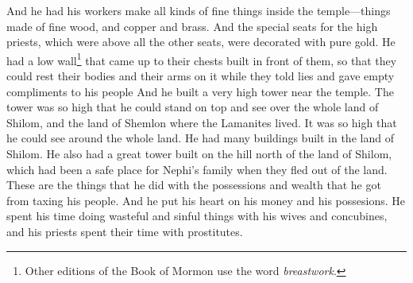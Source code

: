And he had his workers make all kinds of fine things inside the temple---things made of fine wood, and copper and brass.
\bverse \iffalse And the seats which were set apart for the high priests, which were above all the other seats, he did ornament with pure gold; and he caused a breastwork to be built before them, that they might rest their bodies and their arms upon while they should speak lying and vain words to his people. \fi
And the special seats for the high priests, which were above all the other seats, were decorated with pure gold. He had a low wall\footnote{Other editions of the Book of Mormon use the word \textit{breastwork}.} that came up to their chests built in front of them, so that they could rest their bodies and their arms on it while they told lies and gave empty compliments to his people
\bverse \iffalse And it came to pass that he built a tower near the temple; yea, a very high tower, even so high that he could stand upon the top thereof and overlook the land of Shilom, and also the land of Shemlon, which was possessed by the Lamanites; and he could even look over all the land round about. \fi
And he built a very high tower near the temple. The tower was so high that he could stand on top and see over the whole land of Shilom, and the land of Shemlon where the Lamanites lived. It was so high that he could see around the whole land.
\bverse \iffalse And it came to pass that he caused many buildings to be built in the land Shilom; and he caused a great tower to be built on the hill north of the land Shilom, which had been a resort for the children of Nephi at the time they fled out of the land; and thus he did do with the riches which he obtained by the taxation of his people. \fi
He had many buildings built in the land of Shilom. He also had a great tower built on the hill north of the land of Shilom, which had been a safe place for Nephi's family when they fled out of the land. These are the things that he did with the possessions and wealth that he got from taxing his people.
\bverse \iffalse And it came to pass that he placed his heart upon his riches, and he spent his time in riotous living with his wives and his concubines; and so did also his priests spend their time with harlots. \fi
And he put his heart on his money and his possesions. He spent his time doing wasteful and sinful things with his wives and concubines, and his priests spent their time with prostitutes.
\bverse \iffalse And it came to pass that he planted vineyards round about in the land; and he built wine-presses, and made wine in abundance; and therefore he became a wine-bibber, and also his people. \fi
